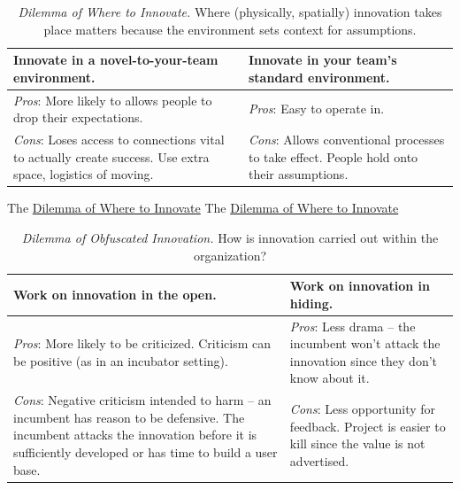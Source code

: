 \begin{center}
\begin{table}[H] %
\begin{tabular}{ | m{\dilemmatablewidth}| m{\dilemmatablewidth} | } 
  \hline
  \textbf{Innovate in a novel-to-your-team environment.} &
  \textbf{Innovate in your team's standard environment.} \\
  \hline
  \textit{Pros}: More likely to allows people to drop their expectations.  & 
  \textit{Pros}: Easy to operate in. \\
  \hline
  \textit{Cons}: Loses access to connections vital to actually create success. Use extra space, logistics of moving. & 
  \textit{Cons}: Allows conventional processes to take effect. People hold onto their assumptions. \\
  \hline
\end{tabular}
\caption{
\textit{Dilemma of Where to Innovate.}
Where (physically, spatially) innovation takes place matters because the environment sets context for assumptions.
}
\label{table:where-to-innovate}
\end{table}
\end{center}

The \href{table:where-to-innovate}{Dilemma of Where to Innovate}
The \href{table:where-to-innovate}{Dilemma of Where to Innovate}


\begin{center}
\begin{table}[H] %
\begin{tabular}{ | m{\dilemmatablewidth}| m{\dilemmatablewidth} | } 
  \hline
  \textbf{Work on innovation in the open.} &
  \textbf{Work on innovation in hiding.} \\
  \hline
  \textit{Pros}: More likely to be criticized. Criticism can be positive (as in an incubator setting).& 
  \textit{Pros}: Less drama -- the incumbent won't attack the innovation since they don't know about it. \\
  \hline
  \textit{Cons}: Negative criticism intended to harm -- an incumbent has reason to be defensive. The incumbent attacks the innovation before it is sufficiently developed or has time to build a user base. & 
  \textit{Cons}: Less opportunity for feedback. Project is easier to kill since the value is not advertised.\\
  \hline
\end{tabular}
\caption{
\textit{Dilemma of Obfuscated Innovation.}
How is innovation carried out within the organization?
}
\label{table:innovate-open-obscure}
\end{table}
\end{center}

